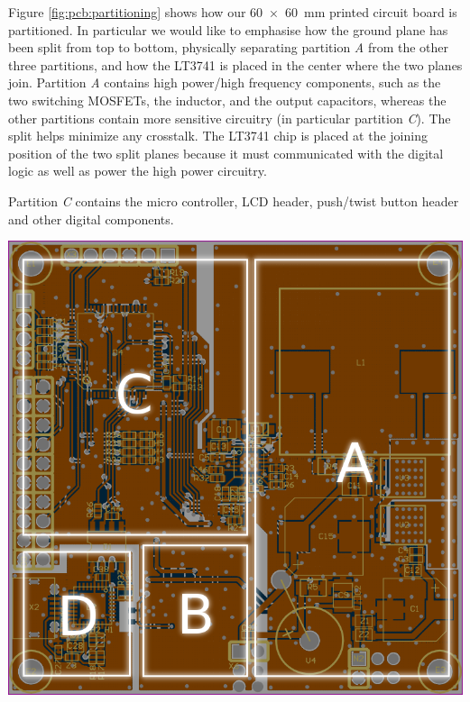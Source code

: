 \begin{minipage}{0.5\textwidth}
    Figure \ref{fig:pcb:partitioning}  shows how  our \SI{60x60}{\milli\meter}
    printed  circuit  board  is  partitioned.  In  particular  we  would  like
    to  emphasise   how  the  ground  plane   has  been  split  from   top  to
    bottom,  physically separating  partition  \emph{A} from  the other  three
    partitions,  and how  the LT3741  is placed  in the  center where  the two
    planes  join.   Partition  \emph{A}  contains  high  power/high  frequency
    components,  such as  the two  switching  MOSFETs, the  inductor, and  the
    output  capacitors, whereas  the other  partitions contain  more sensitive
    circuitry (in particular partition \emph{C}). The split helps minimize any
    crosstalk. The LT3741  chip is placed at  the joining position of  the two
    split planes because  it must communicated with the digital  logic as well
    as power the high power circuitry.

    Partition \emph{C}  contains the micro controller,  LCD header, push/twist
    button header and other digital components.

\end{minipage}
\begin{minipage}{0.5\textwidth}
    \centering
    \includegraphics[width=.9\linewidth]{images/pcb/partitioning.png}
    \label{fig:pcb:partitioning}
\end{minipage}

